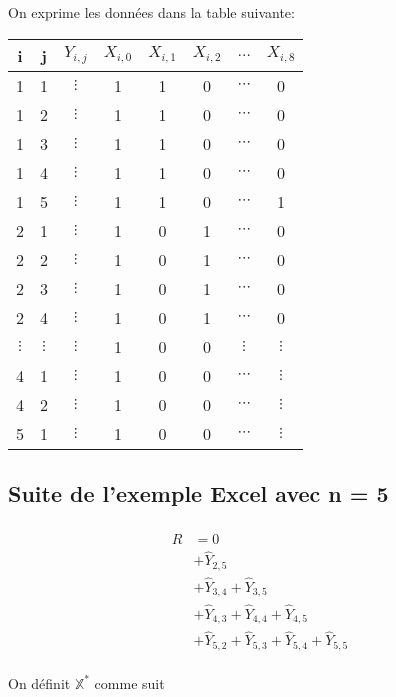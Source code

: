 \documentclass[11pt,french]{report}
\begin{document}
\newpage
On exprime les données dans la table suivante:

\begin{center}
\begin{tabular}{|c|c|c|c|c|c|c|c|}
  \hline
   i & j & $Y_{i,j}$ & $X_{i,0}$  & $X_{i,1}$ & $X_{i,2}$ & $\ldots$ & $X_{i,8}$\\
  \hline
  1 & 1 & $\vdots$ & 1 & 1 & 0 & $\cdots$ & 0\\
  1 & 2 & $\vdots$ & 1 & 1 & 0 & $\cdots$ & 0\\
  1 & 3 & $\vdots$ & 1 & 1 & 0 & $\cdots$ & 0\\
  1 & 4 & $\vdots$ & 1 & 1 & 0 & $\cdots$ & 0\\
  1 & 5 & $\vdots$ & 1 & 1 & 0 & $\cdots$ & 1\\
  2 & 1 & $\vdots$ & 1 & 0 & 1 & $\cdots$ & 0\\
  2 & 2 & $\vdots$ & 1 & 0 & 1 & $\cdots$ & 0\\
  2 & 3 & $\vdots$ & 1 & 0 & 1 & $\cdots$ & 0\\
  2 & 4 & $\vdots$ & 1 & 0 & 1 & $\cdots$ & 0\\
  $\vdots$ & $\vdots$ & $\vdots$ & 1 & 0 & 0 & $\vdots$ & $\vdots$ \\
  4 & 1 & $\vdots$ & 1 & 0 & 0 & $\cdots$ & $\vdots$ \\
  4 & 2 & $\vdots$ & 1 & 0 & 0 & $\cdots$ & $\vdots$ \\
  5 & 1 & $\vdots$ & 1 & 0 & 0 & $\cdots$ & $\vdots$ \\
  \hline
\end{tabular}

\end{center}
\subsection*{Suite de l'exemple Excel avec n = 5}
\begin{align*}
\widehat{R} &= 0 \\
&+ \widehat{Y}_{2,5} \\
&+ \widehat{Y}_{3,4} + \widehat{Y}_{3,5} \\
&+ \widehat{Y}_{4,3} + \widehat{Y}_{4,4} + \widehat{Y}_{4,5} \\
&+ \widehat{Y}_{5,2} + \widehat{Y}_{5,3} + \widehat{Y}_{5,4} +  \widehat{Y}_{5,5}\\
\end{align*}

\newpage

On définit $\mathbb{X}^*$ comme suit
\end{document}
